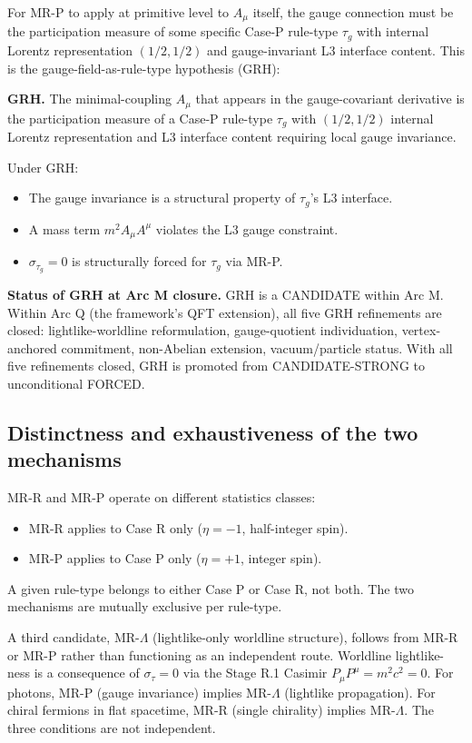 \documentclass[11pt,a4paper]{article}
\begin{document}
For MR-P to apply at primitive level to $A_\mu$ itself, the gauge connection must be the participation measure of some specific Case-P rule-type $\tau_g$ with internal Lorentz representation $(1/2, 1/2)$ and gauge-invariant L3 interface content. This is the gauge-field-as-rule-type hypothesis (GRH):

\textbf{GRH.} The minimal-coupling $A_\mu$ that appears in the gauge-covariant derivative is the participation measure of a Case-P rule-type $\tau_g$ with $(1/2, 1/2)$ internal Lorentz representation and L3 interface content requiring local gauge invariance.

Under GRH:

\begin{itemize}[noitemsep]
  \item The gauge invariance is a structural property of $\tau_g$'s L3 interface.
  \item A mass term $m^2 A_\mu A^\mu$ violates the L3 gauge constraint.
  \item $\sigma_{\tau_g} = 0$ is structurally forced for $\tau_g$ via MR-P.
\end{itemize}

\textbf{Status of GRH at Arc M closure.} GRH is a CANDIDATE within Arc M. Within Arc Q (the framework's QFT extension), all five GRH refinements are closed: lightlike-worldline reformulation, gauge-quotient individuation, vertex-anchored commitment, non-Abelian extension, vacuum/particle status. With all five refinements closed, GRH is promoted from CANDIDATE-STRONG to unconditional FORCED.

\subsection{Distinctness and exhaustiveness of the two mechanisms}

MR-R and MR-P operate on different statistics classes:

\begin{itemize}[noitemsep]
  \item MR-R applies to Case R only ($\eta = -1$, half-integer spin).
  \item MR-P applies to Case P only ($\eta = +1$, integer spin).
\end{itemize}

A given rule-type belongs to either Case P or Case R, not both. The two mechanisms are mutually exclusive per rule-type.

A third candidate, MR-$\Lambda$ (lightlike-only worldline structure), follows from MR-R or MR-P rather than functioning as an independent route. Worldline lightlike-ness is a consequence of $\sigma_\tau = 0$ via the Stage R.1 Casimir $P_\mu P^\mu = m^2 c^2 = 0$. For photons, MR-P (gauge invariance) implies MR-$\Lambda$ (lightlike propagation). For chiral fermions in flat spacetime, MR-R (single chirality) implies MR-$\Lambda$. The three conditions are not independent.
\end{document}
